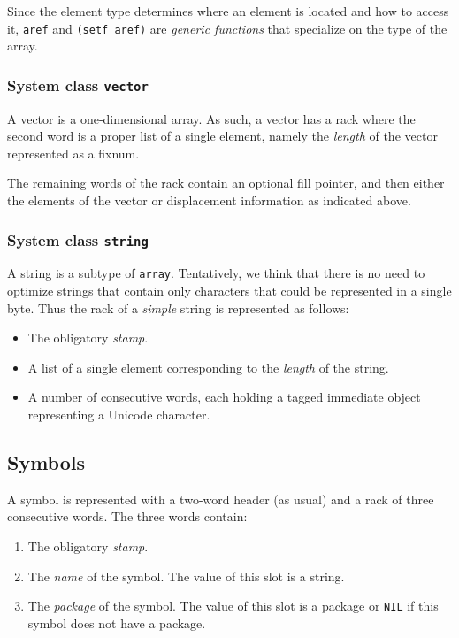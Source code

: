 Since the element type determines where an element is located and how
to access it, \texttt{aref} and \texttt{(setf aref)} are \emph{generic
  functions} that specialize on the type of the array.

\subsubsection{System class \texttt{vector}}

A vector is a one-dimensional array.  As such, a vector has a rack
where the second word is a proper list of a single element,
namely the \emph{length} of the vector represented as a fixnum.

The remaining words of the rack contain an optional fill
pointer, and then either the elements of the vector or displacement
information as indicated above.

\subsubsection{System class \texttt{string}}

A string is a subtype of \texttt{array}.  Tentatively, we think that
there is no need to optimize strings that contain only characters that
could be represented in a single byte.  Thus the rack of a
\emph{simple} string is represented as follows:

\begin{itemize}
\item The obligatory \emph{stamp}.
\item A list of a single element corresponding to the \emph{length} of
  the string.
\item A number of consecutive words, each holding a tagged immediate
  object representing a Unicode character.
\end{itemize}

\subsection{Symbols}

A symbol is represented with a two-word header (as usual) and a
rack of three consecutive words.  The three words contain:

\begin{enumerate}
\item The obligatory \emph{stamp}.
\item The \emph{name} of the symbol.  The value of this slot is a
  string.
\item The \emph{package} of the symbol.  The value of this slot is a
  package or \texttt{NIL} if this symbol does not have a package.
\end{enumerate}

